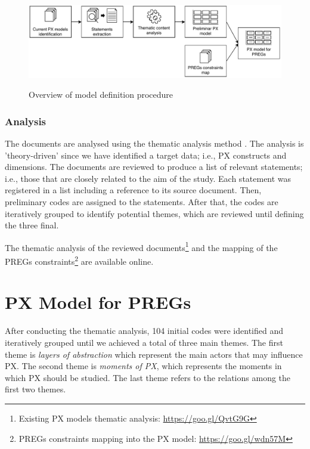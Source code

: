 \begin{figure}[bth]
\myfloatalign
{\includegraphics[width=\linewidth]{gfx/model/modelDefiniton}} \quad
\caption{Overview of model definition procedure}\label{fig:modelDefiniton}
\end{figure}

\subsubsection{Analysis}
The documents are analysed using the thematic analysis method \autocite{Braun}. The analysis is 'theory-driven' since we have identified a target data; i.e., \ac{PX} constructs and dimensions. The documents are reviewed to produce a list of relevant statements; i.e., those that are closely related to the aim of the study. Each statement was registered in a list including a reference to its source document. Then, preliminary codes are assigned to the statements. After that, the codes are iteratively grouped to identify potential themes, which are reviewed until defining the three final.

The thematic analysis of the reviewed documents\footnote{Existing PX models thematic analysis: \url{https://goo.gl/QvtG9G}} and the mapping of the \acp{PREG} constraints\footnote{PREGs constraints mapping into the PX model: \url{https://goo.gl/wdn57M}} are available online.

\section{PX Model for PREGs} %
\label{sec:preg_px_model}
After conducting the thematic analysis, 104 initial codes were identified and iteratively grouped until we achieved a total of three main themes. The first theme is \textit{layers of abstraction} which represent the main actors that may influence \ac{PX}. The second theme is \textit{moments of \ac{PX}}, which represents the moments in which \ac{PX} should be studied. The last theme refers to the relations among the first two themes.

